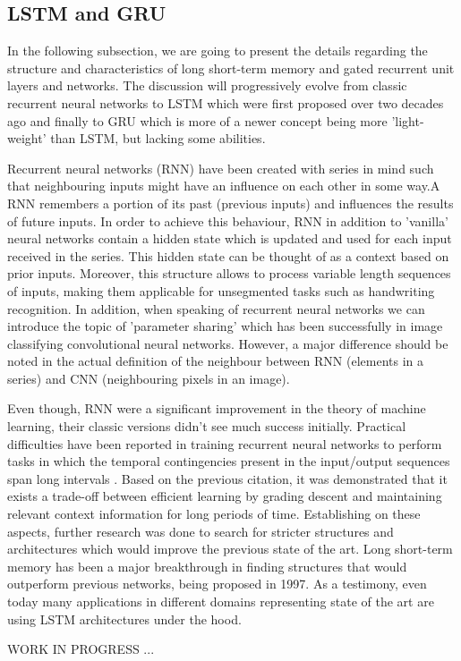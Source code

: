 \subsection{LSTM and GRU}
In the following subsection, we are going to present the details regarding the structure and characteristics of long short-term memory and gated recurrent unit layers and networks. The discussion will progressively evolve from classic recurrent neural networks to LSTM which were first proposed over two decades ago and finally to GRU which is more of a newer concept being more 'light-weight' than LSTM, but lacking some abilities.

Recurrent neural networks (RNN) have been created with series in mind such that neighbouring inputs might have an influence on each other in some way.A RNN remembers a portion of its past (previous inputs) and influences the results of future inputs. In order to achieve this behaviour, RNN in addition to 'vanilla' neural networks contain a hidden state which is updated and used for each input received in the series. This hidden state can be thought of as a context based on prior inputs. Moreover, this structure allows to process variable length sequences of inputs, making them applicable for unsegmented tasks such as handwriting recognition. In addition, when speaking of recurrent neural networks we can introduce the topic of 'parameter sharing' which has been successfully in image classifying convolutional neural networks. However, a major difference should be noted in the actual definition of the neighbour between RNN (elements in a series) and CNN (neighbouring pixels in an image).

Even though, RNN were a significant improvement in the theory of machine learning, their classic versions didn't see much success initially. Practical difficulties have been reported in training recurrent neural networks to perform tasks in which the temporal contingencies present in the input/output sequences span long intervals \cite{bengio1994learning}. Based on the previous citation, it was demonstrated that it exists a trade-off between efficient learning by grading descent and maintaining relevant context information for long periods of time. Establishing on these aspects, further research was done to search for stricter structures and architectures which would improve the previous state of the art. Long short-term memory has been a major breakthrough in finding structures that would outperform previous networks, being proposed in 1997. As a testimony, even today many applications in different domains representing state of the art are using LSTM architectures under the hood.

WORK IN PROGRESS ...